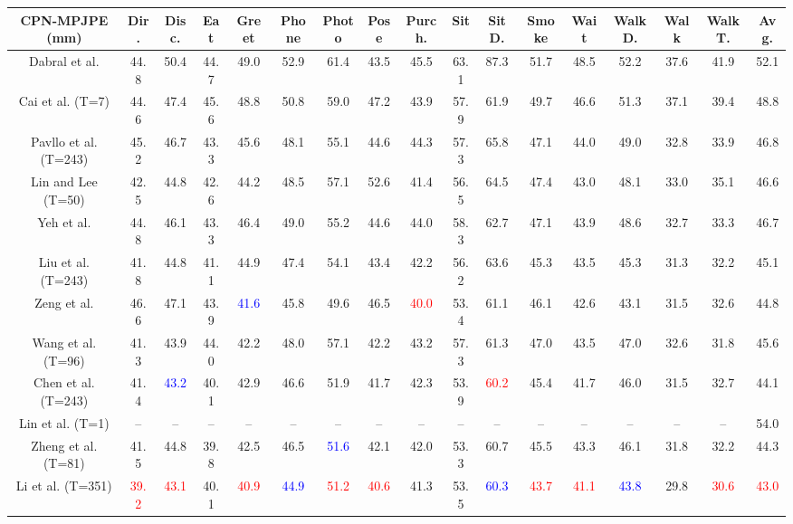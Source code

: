 \documentclass{article}
\begin{document}
\begin{table*}[!htb]
{\begin{tabular}{*{17}{|c}|}
  \hline
  
    \hline
  \textbf{CPN-MPJPE (mm)} & \textbf{Dir.} & \textbf{Disc.} & \textbf{Eat} & \textbf{Greet} & \textbf{Phone} & \textbf{Photo} & \textbf{Pose}  & \textbf{Purch.} & \textbf{Sit} & \textbf{SitD.} & \textbf{Smoke} & \textbf{Wait} & \textbf{WalkD.} & \textbf{Walk}  & \textbf{WalkT.} & \textbf{Avg.} \\

 \hline
  Dabral et al. \cite{DMKASJ18} & 44.8 & 50.4 & 44.7 & 49.0 & 52.9 & 61.4 & 43.5 &  45.5 &  63.1 & 87.3 &  51.7 & 48.5 & 52.2 & 37.6 & 41.9 & 52.1 \\
  Cai et al.  \cite{CGLCCYT19} (T=7) & 44.6 & 47.4 & 45.6 & 48.8 & 50.8 & 59.0 & 47.2 & 43.9 & 57.9 & 61.9 & 49.7 &46.6 & 51.3 & 37.1 & 39.4 & 48.8 \\
  Pavllo et al. \cite{PFGA19} (T=243) & 45.2 & 46.7 & 43.3 & 45.6 & 48.1 & 55.1 & 44.6 & 44.3 & 57.3 & 65.8 & 47.1 & 44.0 &49.0 & 32.8 & 33.9 & 46.8 \\
 Lin and Lee \cite{LL19} (T=50) & 42.5 & 44.8 & 42.6 & 44.2 & 48.5 & 57.1 & 52.6 & 41.4 & 56.5 & 64.5 & 47.4 & 43.0 & 48.1 & 33.0 & 35.1 & 46.6 \\
 Yeh et al.  \cite{YHS19} & 44.8 & 46.1 & 43.3 & 46.4 & 49.0 & 55.2 & 44.6 & 44.0 & 58.3 & 62.7 & 47.1 & 43.9 & 48.6 & 32.7 & 33.3 & 46.7 \\
  Liu et al. \cite{LSWCCA20}  (T=243) & 41.8 & 44.8 & 41.1 & 44.9 & 47.4 & 54.1 & 43.4 & 42.2 & 56.2 & 63.6 & 45.3 & 43.5 & 45.3 & 31.3 & 32.2 & 45.1 \\
   Zeng et al. \cite{ZSHLXL20} & 46.6 & 47.1 & 43.9 & \textcolor{blue}{41.6} & 45.8 & 49.6 & 46.5 & \textcolor{red}{40.0} & 53.4 & 61.1 & 46.1 & 42.6 & 43.1 & 31.5 & 32.6 & 44.8 \\
   Wang et al.   \cite{WYXL20} (T=96) & 41.3 & 43.9 & 44.0 & 42.2 & 48.0 & 57.1 & 42.2 & 43.2 & 57.3 & 61.3 & 47.0 & 43.5 & 47.0 & 32.6 & 31.8 & 45.6 \\
   Chen et al. \cite{CFSZCL21} (T=243) & 41.4 & \textcolor{blue}{43.2} & 40.1 & 42.9 & 46.6 & 51.9 & 41.7 & 42.3 & 53.9 & \textcolor{red}{60.2} & 45.4 & 41.7 & 46.0 & 31.5 & 32.7 & 44.1 \\
    Lin et al. \cite{LWL21} (T=1) & -- & -- & -- & -- & -- & -- & -- & -- & -- & -- & -- & -- & -- & -- & -- & 54.0 \\
   Zheng et al. \cite{ZZMYCD21} (T=81) & 41.5 & 44.8 & 39.8 & 42.5 & 46.5 & \textcolor{blue}{51.6} & 42.1 & 42.0 & 53.3 & 60.7 & 45.5 & 43.3 & 46.1 &  31.8 & 32.2 & 44.3 \\
   Li et al. \cite{li2022mhformer} (T=351) & \textcolor{red}{39.2} & \textcolor{red}{43.1} & 40.1 & \textcolor{red}{40.9} & \textcolor{blue}{44.9} & \textcolor{red}{51.2} & \textcolor{red}{40.6} & 41.3 & 53.5 & \textcolor{blue}{60.3} & \textcolor{red}{43.7} & \textcolor{red}{41.1} & \textcolor{blue}{43.8} & 29.8 & \textcolor{red}{30.6} & \textcolor{red}{43.0} \\
 

\end{tabular}}
\end{table*}
\end{document}
